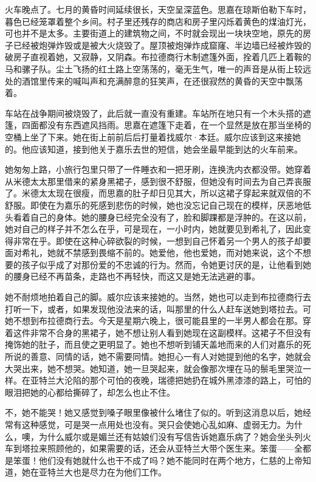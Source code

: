 \par 火车晚点了。七月的黄昏时间延续很长，天空呈深蓝色。思嘉在琼斯伯勒下车时，暮色已经笼罩着整个乡间。村子里还残存的商店和房子里闪烁着黄色的煤油灯光，可也并不是太多。主要街道上的建筑物之间，不时就会现出一块块空地，原先的房子已经被炮弹炸毁或是被大火烧毁了。屋顶被炮弹炸成窟窿、半边墙已经被炸毁的破房子直视着她，又寂静，又阴森。布拉德商行木制遮篷外面，拴着几匹上着鞍的马和骡子队。尘土飞扬的红土路上空荡荡的，毫无生气，唯一的声音是从街上较远处的酒馆里传来的喊叫声和充满醉意的狂笑声，在还很寂然的黄昏的天空中飘荡着。
\par 车站在战争期间被烧毁了，此后就一直没有重建。车站所在地只有一个木头搭的遮篷，四面都没有东西遮风挡雨。思嘉在遮篷下走着，在一个显然是放在那当坐椅的空桶上坐了下来。她在街上前前后后打量着找威尔·本廷。威尔应该到这来接她的。他应该知道，接到他关于嘉乐去世的短信，她会坐最早能到达的火车前来。
\par 她匆匆上路，小旅行包里只带了一件睡衣和一把牙刷，连换洗内衣都没带。她穿着从米德太太那里借来的紧身黑裙子，感到很不舒服，但她没有时间去为自己弄丧服了。米德太太现在很瘦，而思嘉的肚子却日见其大，所以这裙子穿起来就双倍的不舒服。即使在为嘉乐的死感到悲伤的时候，她也没忘记自己现在的模样，厌恶地低头看着自己的身体。她的腰身已经完全没有了，脸和脚踝都是浮肿的。在这以前，她对自己的样子并不怎么在乎，可是现在，一小时内，她就要见到希礼了，因此变得非常在乎。即使在这种心碎欲裂的时候，一想到自己怀着另一个男人的孩子却要面对希礼，她就不禁感到畏缩不前的。她爱他，他也爱她，而对她来说，这个不想要的孩子似乎成了对那份爱的不忠诚的行为。然而，令她更讨厌的是，让他看到她的腰身已经不再苗条，走路也不再轻快，而这又是她无法逃避的事。
\par 她不耐烦地拍着自己的脚。威尔应该来接她的。当然，她也可以走到布拉德商行去打听一下，或者，如果发现他没法来的话，叫那里的什么人赶车送她到塔拉去。可她不想到布拉德商行去。今天是星期六晚上，很可能县里的一半男人都会在那。穿着这件非常不合身的黑裙子，她不想让别人看到她现在这副模样。这裙子不但没有掩饰她的肚子，而且使之更明显了。她也不想听到铺天盖地而来的人们对嘉乐的死所说的善意、同情的话，她不需要同情。她担心一有人对她提到他的名字，她就会大哭出来，她不想哭。她知道，她一旦哭起来，就会像那次埋在马的鬃毛里哭泣一样。在亚特兰大沦陷的那个可怕的夜晚，瑞德把她扔在城外黑漆漆的路上，可怕的眼泪把她的心都给撕碎了，却怎么也止不住。
\par 不，她不能哭！她又感觉到嗓子眼里像被什么堵住了似的。听到这消息以后，她经常有这种感觉，可是哭一点用处也没有。哭只会使她心乱如麻、虚弱无力。为什么，噢，为什么威尔或是媚兰还有姑娘们没有写信告诉她嘉乐病了？她会坐头列火车到塔拉来照顾他的，如果需要的话，还会从亚特兰大带个医生来。笨蛋——全都是笨蛋！他们没有她就什么也干不成了吗？她不能同时在两个地方，仁慈的上帝知道，她在亚特兰大也是尽力在为他们工作。
